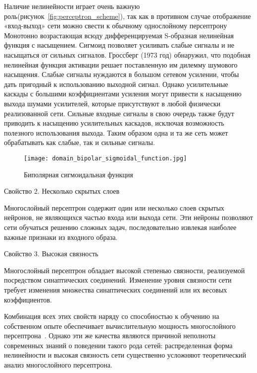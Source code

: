 Наличие нелинейности играет очень важную роль(рисунок~\ref{fig:perceptron_scheme}), так как в противном случае отображение «вход-выход» сети можно свести к обычному однослойному персептрону
Монотонно возрастающая всюду дифференцируемая S-образная нелинейная функция с насыщением. Сигмоид позволяет усиливать слабые сигналы и не насыщаться от сильных сигналов. Гроссберг (1973 год) обнаружил, что подобная нелинейная функция активации решает поставленную им дилемму шумового насыщения.
Слабые сигналы нуждаются в большом сетевом усилении, чтобы дать пригодный к использованию выходной сигнал. Однако усилительные каскады с большими коэффициентами усиления могут привести к насыщению выхода шумами усилителей, которые присутствуют в любой физически реализованной сети. Сильные входные сигналы в свою очередь также будут приводить к насыщению усилительных каскадов, исключая возможность полезного использования выхода. Таким образом одна и та же сеть может обрабатывать как слабые, так и сильные сигналы.

\begin{figure}[ht]
\centering
  \texttt{[image: domain\_bipolar\_sigmoidal\_function.jpg]}
  \caption{ Биполярная сигмоидальная функция }
  \label{fig:bipolar_sigmoidal_function}
\end{figure}

Свойство 2. Несколько скрытых слоев

Многослойный персептрон содержит один или несколько слоев скрытых нейронов, не являющихся частью входа или выхода сети.
Эти нейроны позволяют сети обучаться решению сложных задач, последовательно извлекая наиболее важные признаки из входного образа.

Свойство 3. Высокая связность

Многослойный персептрон обладает высокой степенью связности, реализуемой посредством синаптических соединений.
Изменение уровня связности сети требует изменения множества синаптических соединений или их весовых коэффициентов.

Комбинация всех этих свойств наряду со способностью к обучению на собственном опыте обеспечивает вычислительную мощность многослойного персептрона~\cite{domain_rosenblatt}.
Однако эти же качества являются причиной неполноты современных знаний о поведении такого рода сетей: распределенная форма нелинейности и высокая связность сети существенно усложняют теоретический анализ многослойного персептрона.
